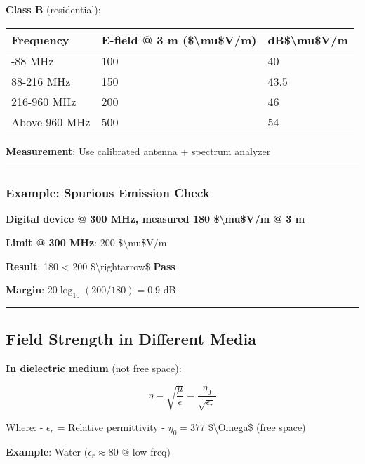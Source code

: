 \textbf{Class B} (residential):

{\def\LTcaptype{} %
\begin{longtable}[]{@{}lll@{}}
\toprule\noalign{}
Frequency & E-field @ 3 m (\$\textbackslash mu\$V/m) &
dB\$\textbackslash mu\$V/m \\
\midrule\noalign{}
\endhead
\bottomrule\noalign{}
\endlastfoot
30-88 MHz & 100 & 40 \\
88-216 MHz & 150 & 43.5 \\
216-960 MHz & 200 & 46 \\
Above 960 MHz & 500 & 54 \\
\end{longtable}
}

\textbf{Measurement}: Use calibrated antenna + spectrum analyzer

\begin{center}\rule{0.5\linewidth}{0.5pt}\end{center}

\subsubsection{Example: Spurious Emission
Check}\label{example-spurious-emission-check}

\textbf{Digital device @ 300 MHz, measured 180 \$\textbackslash mu\$V/m
@ 3 m}

\textbf{Limit @ 300 MHz}: 200 \$\textbackslash mu\$V/m

\textbf{Result}: 180 \textless{} 200 \$\textbackslash rightarrow\$
\textbf{Pass}

\textbf{Margin}: \(20\log_{10}(200/180) = 0.9\) dB

\begin{center}\rule{0.5\linewidth}{0.5pt}\end{center}

\subsection{Field Strength in Different
Media}\label{field-strength-in-different-media}

\textbf{In dielectric medium} (not free space):

\[
\eta = \sqrt{\frac{\mu}{\epsilon}} = \frac{\eta_0}{\sqrt{\epsilon_r}}
\]

Where: - \(\epsilon_r\) = Relative permittivity - \(\eta_0 = 377\)
\$\textbackslash Omega\$ (free space)

\textbf{Example}: Water (\(\epsilon_r \approx 80\) @ low freq)

